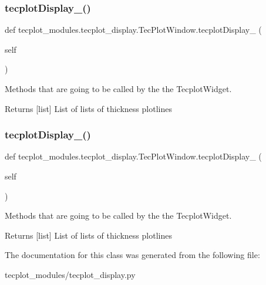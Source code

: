 \subsubsection{\texorpdfstring{tecplot\+Display\+\_()}{tecplotDisplay\_3()}}
{\footnotesize\ttfamily def tecplot\+\_\+modules.\+tecplot\+\_\+display.\+Tec\+Plot\+Window.\+tecplot\+Display\+\_ (\begin{DoxyParamCaption}\item[{}]{self }\end{DoxyParamCaption})}



Methods that are going to be called by the the Tecplot\+Widget. 

\begin{DoxyReturn}{Returns}
\mbox{[}list\mbox{]} List of lists of thickness plotlines 
\end{DoxyReturn}
\hypertarget{a00111_acdc9dc387494507084a2ab2cc0c8d9ac}{}\label{a00111_acdc9dc387494507084a2ab2cc0c8d9ac} 
\subsubsection{\texorpdfstring{tecplot\+Display\+\_()}{tecplotDisplay\_4()}}
{\footnotesize\ttfamily def tecplot\+\_\+modules.\+tecplot\+\_\+display.\+Tec\+Plot\+Window.\+tecplot\+Display\+\_ (\begin{DoxyParamCaption}\item[{}]{self }\end{DoxyParamCaption})}



Methods that are going to be called by the the Tecplot\+Widget. 

\begin{DoxyReturn}{Returns}
\mbox{[}list\mbox{]} List of lists of thickness plotlines 
\end{DoxyReturn}


The documentation for this class was generated from the following file\+:\begin{DoxyCompactItemize}
\item 
tecplot\+\_\+modules/tecplot\+\_\+display.\+py\end{DoxyCompactItemize}
